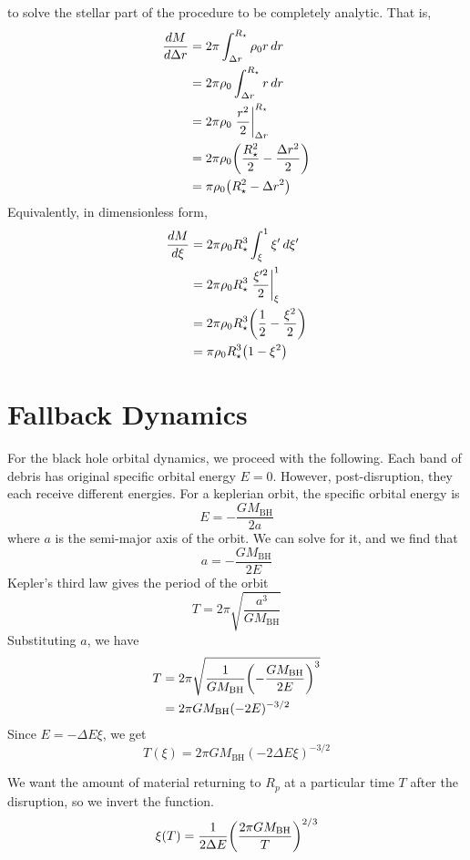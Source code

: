 \documentclass[10pt,a4paper]{article}
\newcommand{\mbh}{M_\text{BH}}
\begin{document}
		to solve the stellar part of the procedure to be completely analytic. That is,
		\begin{align}
			\dv{M}{\Delta r} &=
			2\pi \int_{\Delta r}^{R_\star} \rho_0 r \dd{r}\notag\\
							 &= 2\pi\rho_0 \int_{\Delta r}^{R_\star} r \dd{r}\notag\\
							 &= 2\pi\rho_0 \eval{\frac{r^2}{2}}^{R_\star}_{\Delta r}\notag\\
							 &= 2\pi\rho_0 \pqty{\frac{R_\star^2}{2}- \frac{\Delta r^2}{2}}\notag\\
							 &= \pi\rho_0 \pqty{R_\star^2 - \Delta r^2}
		\end{align}
		Equivalently, in dimensionless form,
		\begin{align}
			\dv{M}{\xi}
			&=
			2\pi\rho_0 R_\star^3 \int_\xi^1 \xi' \dd{\xi'}\notag\\
			&= 2\pi\rho_0 R_\star^3 \eval{\frac{\xi'^2}{2}}^{1}_{\xi}\notag\\
			&= 2\pi\rho_0 R_\star^3 \pqty{ \frac{1}{2} - \frac{\xi^2}{2}}\notag\\
			&= \pi\rho_0 R_\star^3 \pqty{1 - \xi^2}
			\label{eq:dmdxi}
		\end{align}

	\section{Fallback Dynamics}
		For the black hole orbital dynamics, we proceed with the following. Each
		band of debris has original specific orbital energy $E= 0$. However, post-disruption, they each
		receive different energies. For a keplerian orbit, the specific orbital energy is
		\begin{equation}
			\label{eq:kepler-energy}
			E = -\frac{G\mbh}{2a} 
		\end{equation}
		where $a$ is the semi-major axis of the orbit. We can solve for it, and we find that
		\[
			a = 
			-\frac{G\mbh}{2E} 
		\]
		Kepler's third law gives the period of the orbit
		\[
			T = 2\pi \sqrt{\frac{a^3}{G\mbh}}
		\]
		Substituting $a$, we have
		\begin{align*}
			T
			&= 2\pi \sqrt{
				\frac{1}{G\mbh}
				\pqty{
					-\frac{G\mbh}{2E} 
				}^3
			}\\
			&= 2\pi G\mbh (-2E)^{-3/2}
		\end{align*}
		Since $E = -\Delta E \xi$, we get 
		\[
			T(\xi) = 
			2\pi G\mbh (-2\Delta E \xi)^{-3/2}
		\]
		
		We want the amount of material returning to $R_p$ at a particular time $T$ after the disruption, so we 
		invert the function.
		\begin{equation}
			\label{eq:xi-t}
			\xi(T) = \frac{1}{2\Delta E} \pqty{
				\frac{2\pi G\mbh}{T} 
			}^{2/3}
		\end{equation}
\end{document}
